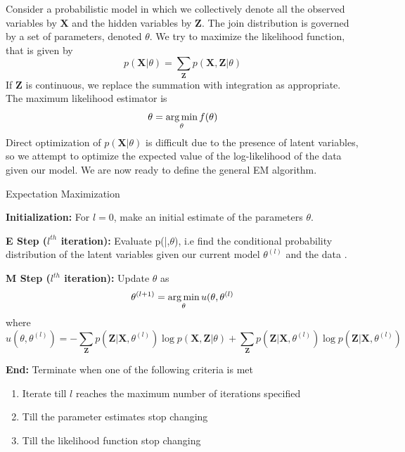 Consider a probabilistic model in which we collectively denote all the observed variables by $\mathbf{X}$ and the hidden variables by $\mathbf{Z}$. The join distribution is governed by a set of parameters, denoted $\theta$. We try to maximize the likelihood function, that is given by 
\begin{equation}
    p(\mathbf{X}|\theta) = \sum_{\mathbf{Z}} p(\mathbf{X},\mathbf{Z} | \theta)
\end{equation}
If $\mathbf{Z}$ is continuous, we replace the summation with integration as appropriate.
The maximum likelihood estimator is 
\begin{equation*}
    \theta = \operatorname*{arg\,min}_{\theta} f(\theta)
\end{equation*}
Direct optimization of $p(\mathbf{X}|\theta)$ is difficult due to the presence of latent variables, so we attempt to optimize the expected value of the log-likelihood of the data given our model. We are now ready to define the general EM algorithm.
\begin{algorithm}[h]
\caption{Expectation Maximization}
\small
        \item \textbf{Initialization:} For $l=0$, make an initial estimate of the parameters $\theta$.
        \item \textbf{E Step ($l^{th}$ iteration):} Evaluate  p(|,$\theta$), i.e find the conditional probability distribution of the latent variables given our current model $\theta^{(l)}$ and the data .
        \item \textbf{M Step ($l^{th}$ iteration):} Update $\theta$ as
        \begin{equation}
            \theta^{(l+1)} = \operatorname*{arg\,min}_{\theta} u(\theta, \theta^{(l)}
        \end{equation}
        where 
        \begin{equation}
            u(\theta, \theta^{(l)}) = 
            - \sum_{\mathbf{Z}} p(\mathbf{Z}| \mathbf{X},\theta^{(l)}) \log p(\mathbf{X},\mathbf{Z}|\theta) 
            + \sum_{\mathbf{Z}} p(\mathbf{Z}| \mathbf{X},\theta^{(l)}) \log p(\mathbf{Z}|\mathbf{X},\theta^{(l)})
        \end{equation}
        \item \textbf{End:} Terminate when one of the following criteria is met
        \begin{enumerate}
            \item Iterate till $l$ reaches the maximum number of iterations specified
            \item Till the parameter estimates stop changing
            \item Till the likelihood function stop changing
        \end{enumerate}
\end{algorithm}

